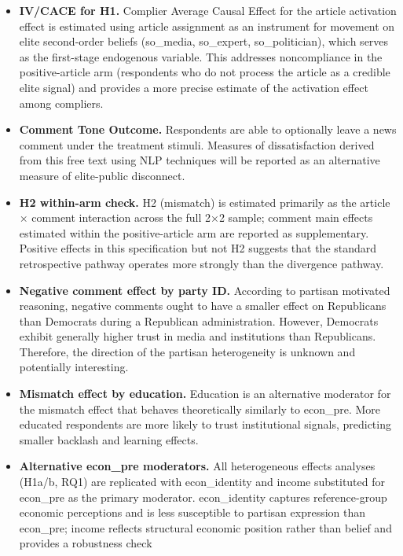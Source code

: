 \documentclass[
  12pt]{article}
\begin{document}
\begin{itemize}
\item
  \textbf{IV/CACE for H1.} Complier Average Causal Effect for the
  article activation effect is estimated using article assignment as an
  instrument for movement on elite second-order beliefs (so\_media,
  so\_expert, so\_politician), which serves as the first-stage
  endogenous variable. This addresses noncompliance in the
  positive-article arm (respondents who do not process the article as a
  credible elite signal) and provides a more precise estimate of the
  activation effect among compliers.
\item
  \textbf{Comment Tone Outcome.} Respondents are able to optionally
  leave a news comment under the treatment stimuli. Measures of
  dissatisfaction derived from this free text using NLP techniques will
  be reported as an alternative measure of elite-public disconnect.
\item
  \textbf{H2 within-arm check.} H2 (mismatch) is estimated primarily as
  the article × comment interaction across the full 2×2 sample; comment
  main effects estimated within the positive-article arm are reported as
  supplementary. Positive effects in this specification but not H2
  suggests that the standard retrospective pathway operates more
  strongly than the divergence pathway.
\item
  \textbf{Negative comment effect by party ID.} According to partisan
  motivated reasoning, negative comments ought to have a smaller effect
  on Republicans than Democrats during a Republican administration.
  However, Democrats exhibit generally higher trust in media and
  institutions than Republicans. Therefore, the direction of the
  partisan heterogeneity is unknown and potentially interesting.
\item
  \textbf{Mismatch effect by education.} Education is an alternative
  moderator for the mismatch effect that behaves theoretically similarly
  to econ\_pre. More educated respondents are more likely to trust
  institutional signals, predicting smaller backlash and learning
  effects.
\item
  \textbf{Alternative econ\_pre moderators.} All heterogeneous effects
  analyses (H1a/b, RQ1) are replicated with econ\_identity and income
  substituted for econ\_pre as the primary moderator. econ\_identity
  captures reference-group economic perceptions and is less susceptible
  to partisan expression than econ\_pre; income reflects structural
  economic position rather than belief and provides a robustness check

\end{itemize}
\end{document}
